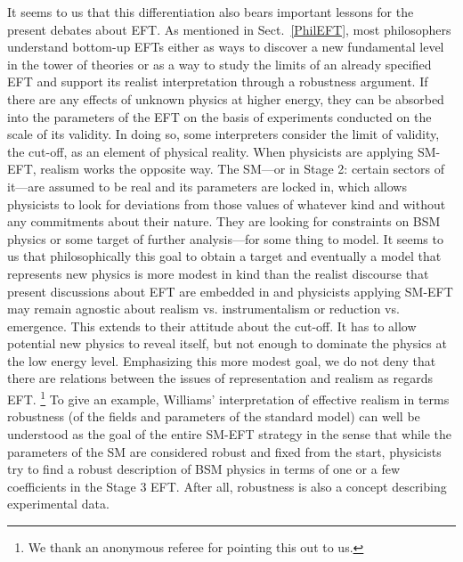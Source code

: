 It seems to us that this differentiation also bears important lessons for the present debates about EFT. 
As mentioned in Sect.~\ref{PhilEFT}, most philosophers understand bottom-up EFTs either as ways to discover a new fundamental level in the tower of theories  or as a way to study the limits of an already specified EFT and support its realist interpretation through a robustness argument. 
If there are any effects of unknown physics at higher energy, they can be absorbed into the parameters of the EFT on the basis of experiments conducted on the scale of its validity. 
In doing so, some interpreters consider the limit of validity, the cut-off, as an element of physical reality. When physicists are applying SM-EFT, realism works the opposite way. 
The SM---or in Stage 2: certain sectors of it---are assumed to be real and its parameters are locked in, which allows physicists to look for deviations from those values of whatever kind and without any commitments about their nature. 
They are looking for constraints on BSM physics or some target of further analysis---for some thing to model. 
It seems to us that philosophically this goal to obtain a target and eventually a model that represents new physics is more modest in kind than the realist discourse that present discussions about EFT are embedded in and physicists applying SM-EFT may remain agnostic about realism vs. instrumentalism or reduction vs. emergence. 
This extends to their attitude about the cut-off. It has to allow potential new physics to reveal itself, but not enough to dominate the physics at the low energy level.
Emphasizing this more modest goal, we do not deny that there are relations between the issues of representation and realism as regards EFT. \footnote{We thank an anonymous referee for pointing this out to us.}
To give an example, Williams' \citeyear{williams2018} interpretation of effective realism in terms robustness (of the fields and parameters of the standard model) can well be understood as the goal of the entire SM-EFT strategy in the sense that while the parameters of the SM are considered robust and fixed from the start, physicists try to find a robust description of BSM physics in terms of one or a few coefficients in the Stage 3 EFT. After all, robustness is also a concept describing experimental data.